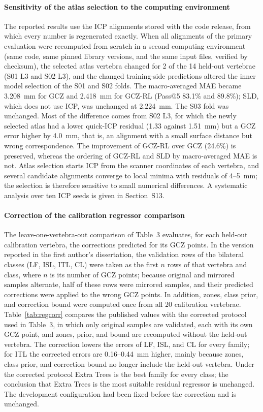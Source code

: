 \documentclass[10pt,a4paper]{article}
\newif\ifhighlight
\newcommand{\revstart}{\ifhighlight\begingroup\color{revcolor}\fi}
\newcommand{\revend}{\ifhighlight\par\endgroup\fi}
\begin{document}
\paragraph{Sensitivity of the atlas selection to the computing environment} The reported results use the ICP alignments stored with the code release, from which every number is regenerated exactly. When all alignments of the primary evaluation were recomputed from scratch in a second computing environment (same code, same pinned library versions, and the same input files, verified by checksum), the selected atlas vertebra changed for 2 of the 14 held-out vertebrae (S01 L3 and S02 L3), and the changed training-side predictions altered the inner model selection of the S01 and S02 folds. The macro-averaged MAE became 3.208~mm for GCZ and 2.418~mm for GCZ-RL (Pass@5 83.1\% and 89.8\%); SLD, which does not use ICP, was unchanged at 2.224~mm. The S03 fold was unchanged. Most of the difference comes from S02 L3, for which the newly selected atlas had a lower quick-ICP residual (1.33 against 1.51~mm) but a GCZ error higher by 4.0~mm, that is, an alignment with a small surface distance but wrong correspondence. The improvement of GCZ-RL over GCZ (24.6\%) is preserved, whereas the ordering of GCZ-RL and SLD by macro-averaged MAE is not. Atlas selection starts ICP from the scanner coordinates of each vertebra, and several candidate alignments converge to local minima with residuals of 4--5~mm; the selection is therefore sensitive to small numerical differences. \revstart A systematic analysis over ten ICP seeds is given in Section~S13.\revend

\paragraph{Correction of the calibration regressor comparison} The leave-one-vertebra-out comparison of Table~3 evaluates, for each held-out calibration vertebra, the corrections predicted for its GCZ points. In the version reported in the first author's dissertation, the validation rows of the bilateral classes (LF, ISL, ITL, CL) were taken as the first $n$ rows of that vertebra and class, where $n$ is its number of GCZ points; because original and mirrored samples alternate, half of these rows were mirrored samples, and their predicted corrections were applied to the wrong GCZ points. In addition, zones, class prior, and correction bound were computed once from all 20 calibration vertebrae. Table~\ref{tab:regcorr} compares the published values with the corrected protocol used in Table~3, in which only original samples are validated, each with its own GCZ point, and zones, prior, and bound are recomputed without the held-out vertebra. The correction lowers the errors of LF, ISL, and CL for every family; for ITL the corrected errors are 0.16--0.44~mm higher, mainly because zones, class prior, and correction bound no longer include the held-out vertebra. Under the corrected protocol Extra Trees is the best family for every class; the conclusion that Extra Trees is the most suitable residual regressor is unchanged. The development configuration had been fixed before the correction and is unchanged.
\end{document}
